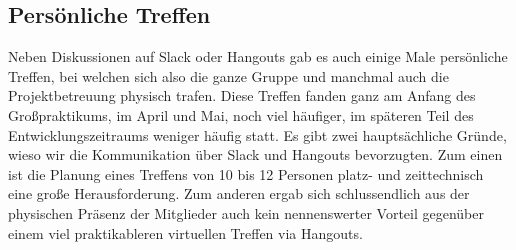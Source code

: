 

\subsection{Persönliche Treffen}
\label{team:group-pers}

Neben Diskussionen auf Slack oder Hangouts gab es auch einige Male persönliche
Treffen, bei welchen sich also die ganze Gruppe und manchmal auch die
Projektbetreuung physisch trafen. Diese Treffen fanden ganz am Anfang des
Großpraktikums, im April und Mai, noch viel häufiger, im späteren Teil des
Entwicklungszeitraums weniger häufig statt. Es gibt zwei hauptsächliche Gründe,
wieso wir die Kommunikation über Slack und Hangouts bevorzugten. Zum einen ist
die Planung eines Treffens von 10 bis 12 Personen platz- und zeittechnisch eine
große Herausforderung. Zum anderen ergab sich schlussendlich aus der physischen
Präsenz der Mitglieder auch kein nennenswerter Vorteil gegenüber einem viel
praktikableren virtuellen Treffen via Hangouts.
